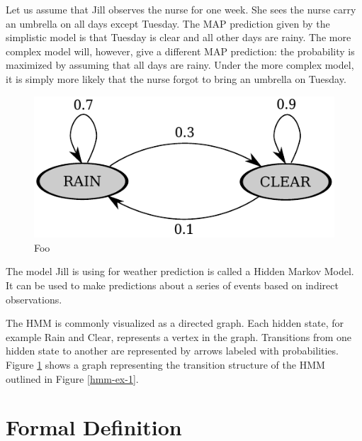 Let us assume that Jill observes the nurse for one week. She sees the
nurse carry an umbrella on all days except Tuesday. The MAP prediction
given by the simplistic model is that Tuesday is clear and all other
days are rainy. The more complex model will, however, give a different
MAP prediction: the probability is maximized by assuming that all days
are rainy. Under the more complex model, it is simply more likely that
the nurse forgot to bring an umbrella on Tuesday.

\begin{figure}[!htb]
\begin{center}
\caption{Foo}\label{hmm-ex-2}
\includegraphics[scale=0.8]{hmm-ex-graph}
\end{center}
\end{figure}

The model Jill is using for weather prediction is called a Hidden
Markov Model. It can be used to make predictions about a series of
events based on indirect observations. 

The HMM is commonly visualized as a directed graph. Each hidden state,
for example Rain and Clear, represents a vertex in the
graph. Transitions from one hidden state to another are represented by
arrows labeled with probabilities. Figure \ref{hmm-ex-2} shows a graph
representing the transition structure of the HMM outlined in Figure
\ref{hmm-ex-1}.

\section{Formal Definition}


